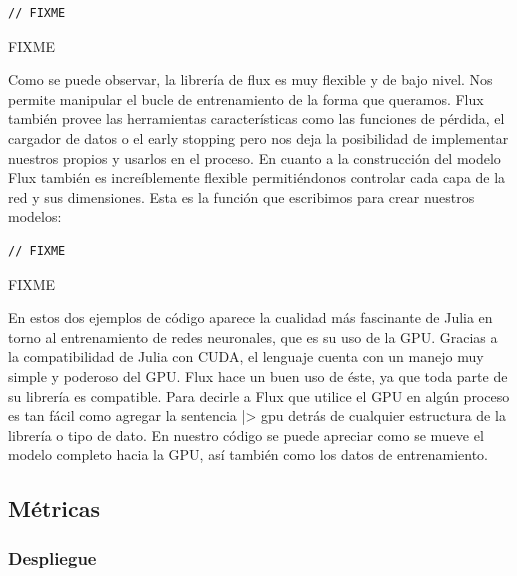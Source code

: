 \documentclass[11pt]{article}
\let\Oldsubsection\subsection
\renewcommand{\subsection}{\FloatBarrier\Oldsubsection}
\let\Oldsubsubsection\subsubsection
\renewcommand{\subsubsection}{\FloatBarrier\Oldsubsubsection}
\begin{document}
\begin{listing}[H]
\begin{verbatim}
// FIXME
\end{verbatim}
\caption{FIXME}
\end{listing}

Como se puede observar, la librería de flux es muy flexible y de bajo nivel. Nos permite manipular el bucle de entrenamiento de la forma que queramos. Flux también provee las herramientas características como las funciones de pérdida, el cargador de datos o el early stopping pero nos deja la posibilidad de implementar nuestros propios y usarlos en el proceso. En cuanto a la construcción del modelo Flux también es increíblemente flexible permitiéndonos controlar cada capa de la red y sus dimensiones. Esta es la función que escribimos para crear nuestros modelos:

\begin{listing}[H]
\begin{verbatim}
// FIXME
\end{verbatim}
\caption{FIXME}
\end{listing}

En estos dos ejemplos de código aparece la cualidad más fascinante de Julia en torno al entrenamiento de redes neuronales, que es su uso de la GPU. Gracias a la compatibilidad de Julia con CUDA, el lenguaje cuenta con un manejo muy simple y poderoso del GPU. Flux hace un buen uso de éste, ya que toda parte de su librería es compatible. Para decirle a Flux que utilice el GPU en algún proceso es tan fácil como agregar la sentencia |> gpu detrás de cualquier estructura de la librería o tipo de dato. En nuestro código se puede apreciar como se mueve el modelo completo hacia la GPU, así también como los datos de entrenamiento. 

\subsection{Métricas}

\subsubsection{Despliegue}
\end{document}

